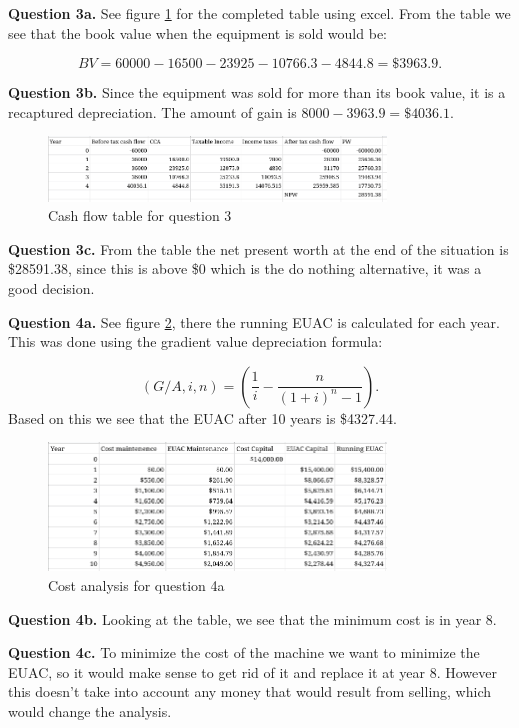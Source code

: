 \documentclass[letterpaper, reqno,11pt]{article}
\begin{document}
{\noindent\bf Question 3a.} See figure \ref{fig:q3} for the completed table using excel. From the table we see that the book value when the equipment is sold would be: 

\[
BV=60000-16500-23925-10766.3-4844.8=\$3963.9
.\]

{\noindent\bf Question 3b.} Since the equipment was sold for more than its book value, it is a recaptured depreciation. The amount of gain is $8000-3963.9=\$4036.1$. 

\begin{figure}[htpb]
    \centering
    \includegraphics[width=0.8\textwidth]{q3}
    \caption{Cash flow table for question 3}
    \label{fig:q3}
\end{figure}

{\noindent\bf Question 3c.} From the table the net present worth at the end of the situation is \$28591.38, since this is above \$0 which is the do nothing alternative, it was a good decision. 

{\noindent\bf Question 4a.} See figure \ref{fig:q4}, there the running EUAC is calculated for each year. This was done using the gradient value depreciation formula: 

\[
    (G/A, i, n)=\left( \frac{1}{i}-\frac{n}{(1+i)^{n}-1} \right) 
.\]
Based on this we see that the EUAC after 10 years is \$4327.44. 

\begin{figure}[htpb]
    \centering
    \includegraphics[width=0.8\textwidth]{q4}
    \caption{Cost analysis for question 4a}
    \label{fig:q4}
\end{figure}

{\noindent\bf Question 4b.} Looking at the table, we see that the minimum cost is in year 8. 

{\noindent\bf Question 4c.} To minimize the cost of the machine we want to minimize the EUAC, so it would make sense to get rid of it and replace it at year 8. However this doesn't take into account any money that would result from selling, which would change the analysis. 
\end{document}
